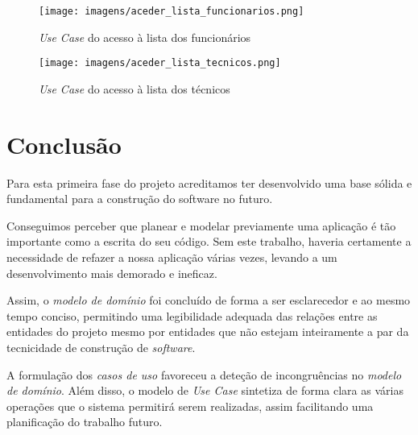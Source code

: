 \documentclass{article}
\begin{document}
\begin{figure}[H]
    \centering
    \texttt{[image: imagens/aceder\_lista\_funcionarios.png]}
    \caption{\textit{Use Case} do acesso à lista dos funcionários}
\end{figure}

\begin{figure}[H]
    \centering
    \texttt{[image: imagens/aceder\_lista\_tecnicos.png]}
    \caption{\textit{Use Case} do acesso à lista dos técnicos}
\end{figure}

\section{Conclusão}

\par Para esta primeira fase do projeto acreditamos ter desenvolvido uma base sólida e fundamental para a construção do software no futuro.
\par Conseguimos perceber que planear e modelar previamente uma aplicação é tão importante como a escrita do seu código. Sem este trabalho, haveria certamente a necessidade de refazer a nossa aplicação várias vezes, levando a um desenvolvimento mais demorado e ineficaz.
\par Assim, o \textit{modelo de domínio} foi concluído de forma a ser esclarecedor e ao mesmo tempo conciso, permitindo uma legibilidade adequada das relações entre as entidades do projeto mesmo por entidades que não estejam inteiramente a par da tecnicidade de construção de \textit{software}. 
\par A formulação dos \textit{casos de uso} favoreceu a deteção de incongruências no \textit{modelo de domínio}. Além disso, o modelo de \textit{Use Case} sintetiza de forma clara as várias operações que o sistema permitirá serem realizadas, assim facilitando uma planificação do trabalho futuro. 
\end{document}
